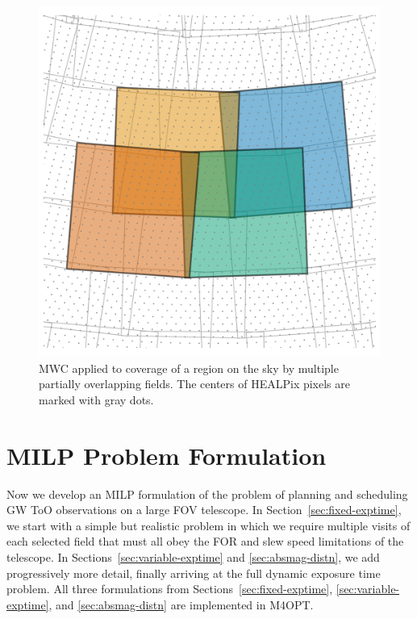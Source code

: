\documentclass[twocolumn,times]{aastex631}
\begin{document}
\begin{figure}
    \includegraphics[width=\columnwidth]{figures/overlapping-fields}
    \caption{\label{fig:overlapping-fields}\ac{MWC} applied to coverage of a region on the sky by multiple partially overlapping fields. The centers of \ac{HEALPix} pixels are marked with gray dots.}
\end{figure}

\section{MILP Problem Formulation}

Now we develop an \ac{MILP} formulation of the problem of planning and scheduling \ac{GW} \ac{ToO} observations on a large \ac{FOV} telescope. In Section~\ref{sec:fixed-exptime}, we start with a simple but realistic problem in which we require multiple visits of each selected field that must all obey the \ac{FOR} and slew speed limitations of the telescope. In Sections~\ref{sec:variable-exptime} and \ref{sec:absmag-distn}, we add progressively more detail, finally arriving at the full dynamic exposure time problem. All three formulations from Sections~\ref{sec:fixed-exptime}, \ref{sec:variable-exptime}, and \ref{sec:absmag-distn} are implemented in \ac{M4OPT}.
\end{document}
